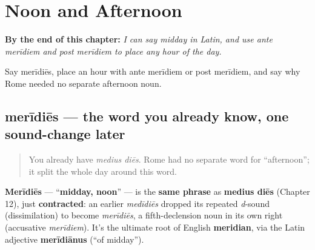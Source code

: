 
\chapter{Noon and Afternoon}
\label{ch:la-noon-and-afternoon}

\begin{chapteropening}
\textbf{By the end of this chapter:} \emph{I can say midday in Latin, and use ante merīdiem and post merīdiem to place any hour of the day.}

Say merīdiēs, place an hour with ante merīdiem or post merīdiem, and say why Rome needed no separate afternoon noun.
\end{chapteropening}

\section[merīdiēs]{merīdiēs — the word you already know, one sound-change later}

\label{lesson:LA-C35-meridies}



\begin{quote}
You already have \emph{medius diēs}. Rome had no separate word for \textquotedblleft{}afternoon\textquotedblright{}; it split the whole day around this word.
\end{quote}

\begin{sounds}
\textbf{Merīdiēs} — \textquotedblleft{}\textbf{midday, noon}\textquotedblright{} — is the \textbf{same phrase} as \textbf{medius diēs} (Chapter 12), just \textbf{contracted}: an earlier \emph{medīdiēs} dropped its repeated \emph{d}-sound (dissimilation) to become \emph{merīdiēs}, a fifth-declension noun in its own right (accusative \emph{merīdiem}). It's the ultimate root of English \textbf{meridian}, via the Latin adjective \textbf{merīdiānus} (\textquotedblleft{}of midday\textquotedblright{}).
\end{sounds}

